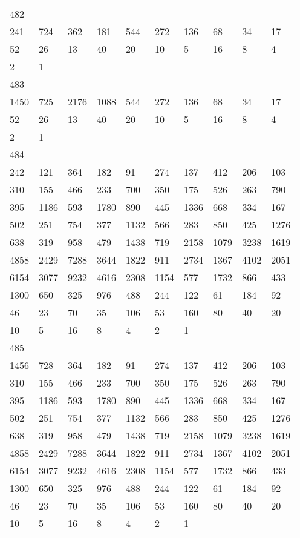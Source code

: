 \begin{longtable}{*{10}{l}}
482&&&&&&&&&\\
241& 724& 362& 181& 544& 272& 136& 68& 34& 17\\
52& 26& 13& 40& 20& 10& 5& 16& 8& 4\\
2& 1& \\

483&&&&&&&&&\\
1450& 725& 2176& 1088& 544& 272& 136& 68& 34& 17\\
52& 26& 13& 40& 20& 10& 5& 16& 8& 4\\
2& 1& \\

484&&&&&&&&&\\
242& 121& 364& 182& 91& 274& 137& 412& 206& 103\\
310& 155& 466& 233& 700& 350& 175& 526& 263& 790\\
395& 1186& 593& 1780& 890& 445& 1336& 668& 334& 167\\
502& 251& 754& 377& 1132& 566& 283& 850& 425& 1276\\
638& 319& 958& 479& 1438& 719& 2158& 1079& 3238& 1619\\
4858& 2429& 7288& 3644& 1822& 911& 2734& 1367& 4102& 2051\\
6154& 3077& 9232& 4616& 2308& 1154& 577& 1732& 866& 433\\
1300& 650& 325& 976& 488& 244& 122& 61& 184& 92\\
46& 23& 70& 35& 106& 53& 160& 80& 40& 20\\
10& 5& 16& 8& 4& 2& 1& \\

485&&&&&&&&&\\
1456& 728& 364& 182& 91& 274& 137& 412& 206& 103\\
310& 155& 466& 233& 700& 350& 175& 526& 263& 790\\
395& 1186& 593& 1780& 890& 445& 1336& 668& 334& 167\\
502& 251& 754& 377& 1132& 566& 283& 850& 425& 1276\\
638& 319& 958& 479& 1438& 719& 2158& 1079& 3238& 1619\\
4858& 2429& 7288& 3644& 1822& 911& 2734& 1367& 4102& 2051\\
6154& 3077& 9232& 4616& 2308& 1154& 577& 1732& 866& 433\\
1300& 650& 325& 976& 488& 244& 122& 61& 184& 92\\
46& 23& 70& 35& 106& 53& 160& 80& 40& 20\\
10& 5& 16& 8& 4& 2& 1& \\


\end{longtable}
